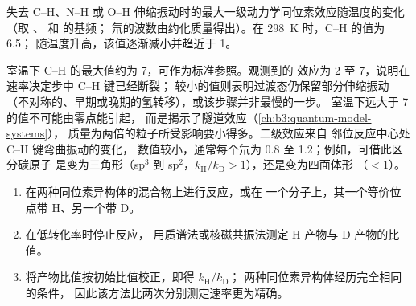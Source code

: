 \begin{omfigure}

{\small 失去 C--H、N--H 或 O--H 伸缩振动时的最大一级动力学同位素效应随温度的变化
（取 、 和  的基频；
氘的波数由约化质量得出）。在 \qty{298}{K} 时，C--H 的值为 6.5；
随温度升高，该值逐渐减小并趋近于 1。}
\end{omfigure}

室温下 C--H 的最大值约为 7，可作为标准参照。观测到的
效应为 2 至 7，说明在速率决定步中 C--H 键已经断裂；
较小的值则表明过渡态仍保留部分伸缩振动
（不对称的、早期或晚期的氢转移），或该步骤并非最慢的一步。
室温下远大于 7 的值不可能由零点能引起，
而是揭示了隧道效应（\cref{ch:b3:quantum-model-systems}），
质量为两倍的粒子所受影响要小得多。二级效应来自
邻位反应中心处 C--H 键弯曲振动的变化，
数值较小，通常每个氘为 0.8 至 1.2；例如，可借此区分碳原子
是变为三角形（sp$^3$ 到 sp$^2$，$k_{\mathrm H}/k_{\mathrm D} > 1$），还是变为四面体形
（$< 1$）。

\begin{method}[通过竞争法测量动力学同位素效应]\label{met:b3:rate-theories:kie}
\begin{enumerate}
  \item 在两种同位素异构体的混合物上进行反应，或在
        一个分子上，其一个等价位点带 H、另一个带 D。
  \item 在低转化率时停止反应，
        用质谱法或核磁共振法测定 H 产物与 D 产物的比值。
  \item 将产物比值按初始比值校正，即得 $k_{\mathrm H}/k_{\mathrm D}$；
        两种同位素异构体经历完全相同的条件，
        因此该方法比两次分别测定速率更为精确。
\end{enumerate}
\end{method}

